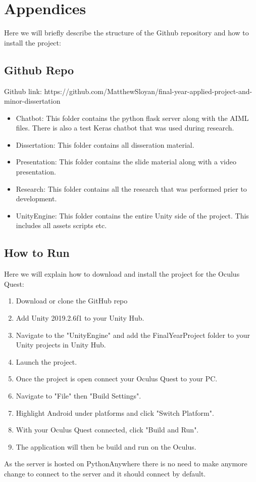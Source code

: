 \chapter{Appendices}

Here we will briefly describe the structure of the Github repository and how to install the project:

\section{Github Repo}
Github link: https://github.com/MatthewSloyan/final-year-applied-project-and-minor-dissertation
\begin{itemize}
    \item Chatbot: This folder contains the python flask server along with the AIML files. There is also a test Keras chatbot that was used during research.
    \item Dissertation: This folder contains all disseration material.
    \item Presentation: This folder contains the slide material along with a video presentation.
    \item Research: This folder contains all the research that was performed prier to development.
    \item UnityEngine: This folder contains the entire Unity side of the project. This includes all assets scripts etc.
\end{itemize}
\newpage
\section{How to Run}
Here we will explain how to download and install the project for the Oculus Quest:
\begin{enumerate}
    \item Download or clone the GitHub repo
    \item Add Unity 2019.2.6f1 to your Unity Hub. 
    \item Navigate to the "UnityEngine" and add the FinalYearProject folder to your Unity projects in Unity Hub.
    \item Launch the project.
    \item Once the project is open connect your Oculus Quest to your PC.
    \item Navigate to "File" then "Build Settings".
    \item Highlight Android under platforms and click "Switch Platform".
    \item With your Oculus Quest connected, click "Build and Run".
    \item The application will then be build and run on the Oculus.
\end{enumerate}

As the server is hosted on PythonAnywhere there is no need to make anymore change to connect to the server and it should connect by default.